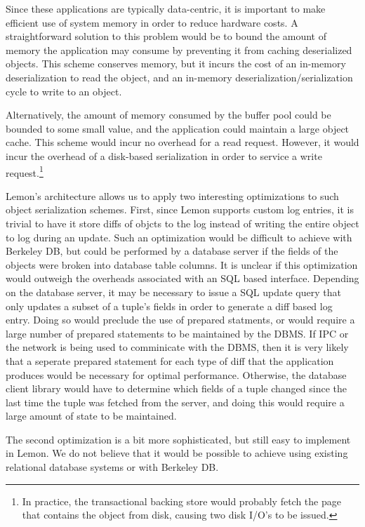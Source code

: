 \documentclass[letterpaper,twocolumn,english]{article}
\newcommand{\yad}{Lemon\xspace}
\begin{document}
Since these applications are typically data-centric, it is important
to make efficient use of system memory in order to reduce hardware
costs.  A straightforward solution to this problem would be to bound
the amount of memory the application may consume by preventing it from
caching deserialized objects.  This scheme conserves memory, but it
incurs the cost of an in-memory deserialization to read the object,
and an in-memory deserialization/serialization cycle to write to an
object.

Alternatively, the amount of memory consumed by the buffer pool could
be bounded to some small value, and the application could maintain a
large object cache.  This scheme would incur no overhead for a read
request.  However, it would incur the overhead of a disk-based
serialization in order to service a write request.\footnote{In
practice, the transactional backing store would probably fetch the
page that contains the object from disk, causing two disk I/O's to be
issued.}

\yad's architecture allows us to apply two interesting optimizations
to such object serialization schemes.  First, since \yad supports
custom log entries, it is trivial to have it store diffs of objcts to
the log instead of writing the entire object to log during an update.
Such an optimization would be difficult to achieve with Berkeley DB,
but could be performed by a database server if the fields of the
objects were broken into database table columns.  It is unclear if
this optimization would outweigh the overheads associated with an SQL
based interface.  Depending on the database server, it may be
necessary to issue a SQL update query that only updates a subset of a
tuple's fields in order to generate a diff based log entry.  Doing so
would preclude the use of prepared statments, or would require a large
number of prepared statements to be maintained by the DBMS.  If IPC or 
the network is being used to comminicate with the DBMS, then it is very
likely that a seperate prepared statement for each type of diff that the 
application produces would be necessary for optimal performance.  
Otherwise, the database client library would have to determine which 
fields of a tuple changed since the last time the tuple was fetched 
from the server, and doing this would require a large amount of state 
to be maintained.


The second optimization is a bit more sophisticated, but still easy to
implement in \yad.  We do not believe that it would be possible to
achieve using existing relational database systems or with Berkeley
DB.  
\end{document}
